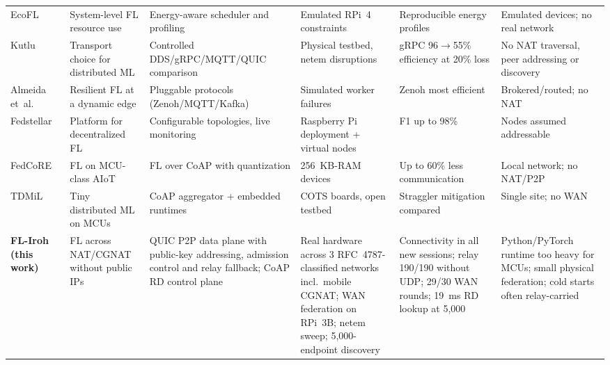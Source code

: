 \begin{table}[!t]
\begin{tabular}{@{}p{1.75cm} p{2.6cm} p{3.0cm} p{2.9cm} p{2.6cm} p{3.6cm}@{}}
EcoFL~\cite{miller2026} & System-level FL resource use & Energy-aware scheduler and profiling & Emulated RPi~4 constraints & Reproducible energy profiles & Emulated devices; no real network \\
Kutlu~\cite{kutlu2026} & Transport choice for distributed ML & Controlled DDS/gRPC/MQTT/QUIC comparison & Physical testbed, netem disruptions & gRPC 96$\to$55\% efficiency at 20\% loss & No NAT traversal, peer addressing or discovery \\
Almeida et~al.~\cite{almeida2025} & Resilient FL at a dynamic edge & Pluggable protocols (Zenoh/MQTT/Kafka) & Simulated worker failures & Zenoh most efficient & Brokered/routed; no NAT \\
Fedstellar~\cite{martinezbeltran2024} & Platform for decentralized FL & Configurable topologies, live monitoring & Raspberry Pi deployment + virtual nodes & F1 up to 98\% & Nodes assumed addressable \\
FedCoRE~\cite{djamaa2025} & FL on MCU-class AIoT & FL over CoAP with quantization & 256~KB-RAM devices & Up to 60\% less communication & Local network; no NAT/P2P \\
TDMiL~\cite{gulati2024} & Tiny distributed ML on MCUs & CoAP aggregator + embedded runtimes & COTS boards, open testbed & Straggler mitigation compared & Single site; no WAN \\
\midrule
\textbf{FL-Iroh (this work)} & FL across NAT/CGNAT without public IPs & QUIC P2P data plane with public-key addressing, admission control and relay fallback; CoAP RD control plane & Real hardware across 3 RFC~4787-classified networks incl.\ mobile CGNAT; WAN federation on RPi~3B; netem sweep; 5{,}000-endpoint discovery & Connectivity in all new sessions; relay 190/190 without UDP; 29/30 WAN rounds; 19~ms RD lookup at 5{,}000 & Python/PyTorch runtime too heavy for MCUs; small physical federation; cold starts often relay-carried \\
\bottomrule
\end{tabular}
\end{table}
